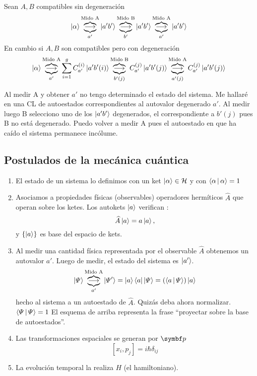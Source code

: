 \documentclass[10pt,oneside]{CBFT_book}
\begin{document}
Sean $A,B$ compatibles sin degeneración
\[
	\Ket{\alpha} \overbrace{\underbrace{\longrightarrow}_{a'}}^{\text{Mido A}} \Ket{a'b'}
	\overbrace{\underbrace{\longrightarrow}_{b'}}^{\text{Mido B}} \Ket{a'b'} 
	\overbrace{\underbrace{\longrightarrow}_{a'}}^{\text{Mido A}} \Ket{a'b'}
\]
En cambio si $A,B$ son compatibles pero con degeneración 
\[
	\Ket{\alpha} \overbrace{\underbrace{\longrightarrow}_{a'}}^{\text{Mido A}} 
		\sum_{i=1}^g C_{a'}^{(i)}\Ket{a'b'(i)} \overbrace{\underbrace{\longrightarrow}_{b'(j)}}^{\text{Mido B}} 
		C_{a'}^{(j)}\Ket{a'b'(j)} \overbrace{\underbrace{\longrightarrow}_{a'(j)}}^{\text{Mido A}} 
		C_{a'}^{(j)} \Ket{a'b'(j)}
\]

Al medir A y obtener $a'$ no tengo determinado el estado del sistema. Me hallaré en una CL de autoestados 
correspondientes al autovalor degenerado $a'$. Al medir luego B selecciono uno de los $\Ket{a'b'}$ degenerados, el 
correspondiente a $b'(j)$ pues B no está degenerado. Puedo volver a medir A pues el autoestado en que ha caído el 
sistema permanece incólume.


\subsection{Postulados de la mecánica cuántica}

\begin{enumerate}
 \item El estado de un sistema lo definimos con un ket $\Ket{\alpha} \in \mathcal{H}$ y con $\Braket{\alpha|\alpha}=1$
 \item Asociamos a propiedades físicas (observables) operadores hermíticos $\widehat{A}$ que operan sobre los ketes. 
	Los autokets $\Ket{a}$ verifican :
\[
	\widehat{A}\Ket{a} = a \Ket{a}, 
\]
y $\{ \Ket{a} \}$ es base del espacio de kets.
 \item Al medir una cantidad física representada por el observable $\widehat{A}$ obtenemos un autovalor $a'$.
 Luego de medir, el estado del sistema es $\Ket{a'}$.
 \[
	\Ket{\Psi} \overbrace{\underbrace{\longrightarrow}_{a'}}^{\text{Mido A}} \Ket{\Psi'} =
	\Ket{a}\Bra{a}\Ket{\Psi} =(\Braket{a|\Psi})\Ket{a}
 \]
 hecho al sistema a un autoestado de $\widehat{A}$. Quizás deba ahora normalizar. $\Braket{\Psi|\Psi}=1$
 El esquema de arriba representa la frase ``proyectar sobre la base de autoestados''.
 \item Las transformaciones espaciales se generan por $\vb{p}$
 \[	
	[x_i,p_j] = i\hbar\delta_{ij}
 \]
 \item La evolución temporal la realiza $H$ (el hamiltoniano).
\end{enumerate}
\end{document}
